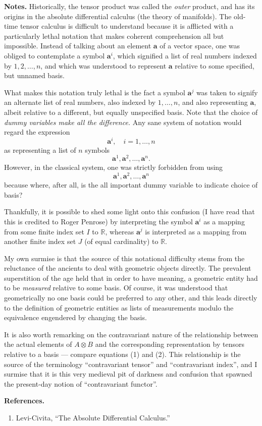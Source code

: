 \documentclass[12pt]{article}
\newcommand{\reals}{\mathbb{R}}
\newcommand{\va}{\mathbf{a}}
\begin{document}
{\bf Notes.} Historically, the tensor product was called the {\em
  outer} product, and has its origins in the absolute differential
calculus (the theory of manifolds).  The old-time tensor calculus is
difficult to understand because it is afflicted with a particularly
lethal notation that makes coherent comprehension all but impossible.
Instead of talking about an element $\va$ of a vector space, one was
obliged to contemplate a symbol $\va^i$, which signified a list of
real numbers indexed by $1,2,\ldots,n$, and which was understood to
represent $\va$ relative to some specified, but unnamed basis.  

What makes this notation truly lethal is the fact a symbol $\va^j$ was
taken to signify an alternate list of real numbers, also indexed by
$1,\ldots, n$, and also representing $\va$, albeit relative to a
different, but equally unspecified basis.  Note that the choice of
{\em dummy variables make all the difference.}  Any sane system of
notation would regard the expression
$$\va^i,\quad i=1,\ldots,n$$
as representing a list of $n$ symbols
$$\va^1,\va^2,\ldots,\va^n.$$
However, in the classical system, one was strictly forbidden from
using
$$\va^1,\va^2,\ldots,\va^n$$
because where, after all, is the all important
dummy variable to indicate choice of basis?

Thankfully, it is possible to shed some light onto this confusion (I
have read that this is credited to Roger Penrose) by interpreting the
symbol $\va^i$ as a mapping from some finite index set $I$ to
$\reals$, whereas $\va^j$ is interpreted as a mapping from another
finite index set $J$ (of equal cardinality) to $\reals$.  


My own surmise is that the source of this notational difficulty stems
from the reluctance of the ancients to deal with geometric objects
directly.  The prevalent superstition of the age held that in order to
have meaning, a geometric entity had to be {\em measured} relative to
some basis.  Of course, it was understood that geometrically no one
basis could be preferred to any other, and this leads directly to the
definition of geometric entities as lists of measurements modulo the
equivalence engendered by changing the basis.

It is also worth remarking on the contravariant nature of the
relationship between the actual elements of $A\otimes B$ and the
corresponding representation by tensors relative to a basis --- compare
equations (1) and (2).
This relationship is the source of the
terminology ``contravariant tensor'' and ``contravariant index'', and
I surmise that  it
is this very medieval pit of darkness and confusion that spawned the
present-day notion of ``contravariant functor''.
\bigskip

{\bf References.}
\begin{enumerate}
\item Levi-Civita, ``The Absolute Differential Calculus.''
\end{enumerate}
\end{document}
